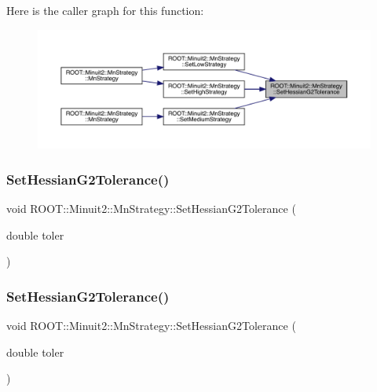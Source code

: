 Here is the caller graph for this function\+:
\nopagebreak
\begin{figure}[H]
\begin{center}
\leavevmode
\includegraphics[width=350pt]{da/de4/classROOT_1_1Minuit2_1_1MnStrategy_aed3f2b229af4c5a4091507830f4275e0_icgraph}
\end{center}
\end{figure}
\mbox{\label{classROOT_1_1Minuit2_1_1MnStrategy_aed3f2b229af4c5a4091507830f4275e0}} 
\subsubsection{\texorpdfstring{SetHessianG2Tolerance()}{SetHessianG2Tolerance()}\hspace{0.1cm}{\footnotesize\ttfamily [2/3]}}
{\footnotesize\ttfamily void R\+O\+O\+T\+::\+Minuit2\+::\+Mn\+Strategy\+::\+Set\+Hessian\+G2\+Tolerance (\begin{DoxyParamCaption}\item[{double}]{toler }\end{DoxyParamCaption})\hspace{0.3cm}{\ttfamily [inline]}}

\mbox{\label{classROOT_1_1Minuit2_1_1MnStrategy_aed3f2b229af4c5a4091507830f4275e0}} 
\subsubsection{\texorpdfstring{SetHessianG2Tolerance()}{SetHessianG2Tolerance()}\hspace{0.1cm}{\footnotesize\ttfamily [3/3]}}
{\footnotesize\ttfamily void R\+O\+O\+T\+::\+Minuit2\+::\+Mn\+Strategy\+::\+Set\+Hessian\+G2\+Tolerance (\begin{DoxyParamCaption}\item[{double}]{toler }\end{DoxyParamCaption})\hspace{0.3cm}{\ttfamily [inline]}}

